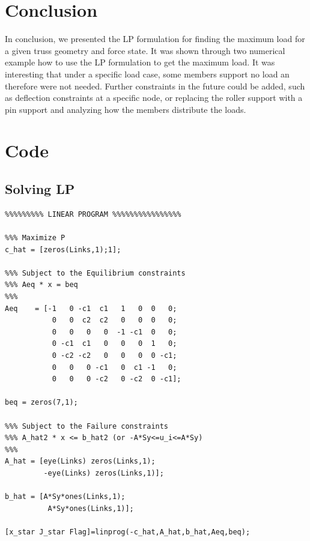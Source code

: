 \documentclass[12pt]{article}
\begin{document}
\section{Conclusion}
In conclusion, we presented the LP formulation for finding the maximum load for a given truss geometry and force state.  It was shown through two numerical example how to use the LP formulation to get the maximum load.  It was interesting that under a specific load case, some members support no load an therefore were not needed.  Further constraints in the future could be added, such as deflection constraints at a specific node, or replacing the roller support with a pin support and analyzing how the members distribute the loads.  

\appendix
\section{Code}
\subsection{Solving LP}
\begin{verbatim}
%%%%%%%%% LINEAR PROGRAM %%%%%%%%%%%%%%%%

%%% Maximize P
c_hat = [zeros(Links,1);1];

%%% Subject to the Equilibrium constraints
%%% Aeq * x = beq
%%%
Aeq    = [-1   0 -c1  c1   1   0  0   0;
           0   0  c2  c2   0   0  0   0;
           0   0   0   0  -1 -c1  0   0;
           0 -c1  c1   0   0   0  1   0;
           0 -c2 -c2   0   0   0  0 -c1;
           0   0   0 -c1   0  c1 -1   0;
           0   0   0 -c2   0 -c2  0 -c1];

beq = zeros(7,1);

%%% Subject to the Failure constraints
%%% A_hat2 * x <= b_hat2 (or -A*Sy<=u_i<=A*Sy)
%%%
A_hat = [eye(Links) zeros(Links,1);
         -eye(Links) zeros(Links,1)];
 
b_hat = [A*Sy*ones(Links,1);
          A*Sy*ones(Links,1)];

[x_star J_star Flag]=linprog(-c_hat,A_hat,b_hat,Aeq,beq);
\end{verbatim}
\end{document}
